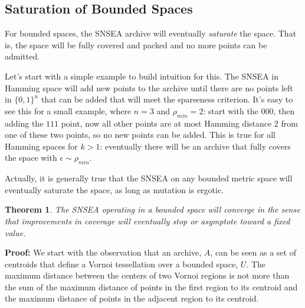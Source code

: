 \documentclass[twoside]{article}
\newtheorem{theorem}{Theorem}
\begin{document}
\subsection{Saturation of Bounded Spaces}
\label{subsec:saturation}
For bounded spaces, the SNSEA archive will eventually \emph{saturate} the space.  That is, the space will be fully covered and packed and no more points can be admitted.  

Let's start with a simple example to build intuition for this.  The  SNSEA in Hamming space will add new points to the archive until there are no points left in $\{0,1\}^n$ that can be added that will meet the sparseness criterion.  It's easy to see this for a small example, where $n=3$ and $\rho_{min} = 2$:  start with the $000$, then adding the $111$ point, now all other points are at most Hamming distance 2 from one of these two points, so no new points can be added.  This is true for all Hamming spaces for $k>1$:  eventually there will be an archive that fully covers the space with $\epsilon \sim \rho_{min}$.

Actually, it is generally true that the SNSEA on any bounded metric space will eventually saturate the space, as long as mutation is ergotic.
\begin{theorem}
The SNSEA operating in a bounded space will converge in the sense that improvements in \emph{coverage} will eventually stop or asymptote toward a fixed value.
\end{theorem}
\textbf{Proof:} We start with the observation that an archive, $A$, can be seen as a set of centroids that define a Vornoi tessellation over a bounded space, $U$.  The maximum distance between the centers of two Vornoi regions is not more than the sum of the maximum distance of points in the first region to its centroid and the maximum distance of points in the adjacent region to its centroid.
\end{document}
